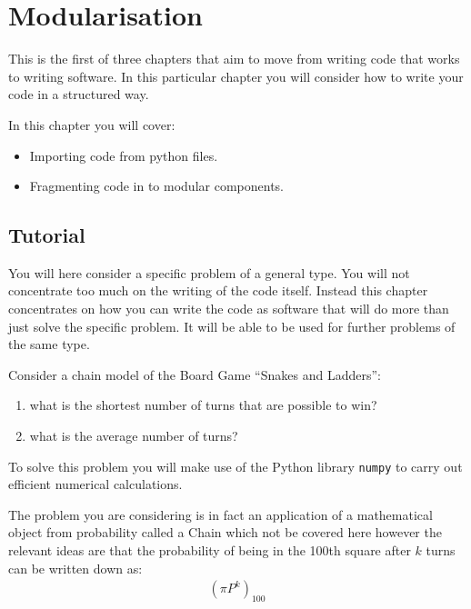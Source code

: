 \chapter{Modularisation}
\label{chp:modularisation}

This is the first of three chapters that aim to move from writing code
that works to writing software. In this particular chapter you will consider how
to write your code in a structured way.

In this chapter you will cover:
\begin{itemize}
    \item Importing code from python files.
    \item Fragmenting code in to modular components.
\end{itemize}


\section{Tutorial}
\label{sec:modularisation_tutorial}

You will here consider a specific problem of a general type. You will not
concentrate too much on the writing of the code itself. Instead this chapter
concentrates
on how you can write the code as software that will do more than just solve the
specific problem. It will be able to be used for further problems of the same
type.

Consider a  chain model of the Board Game ``Snakes and Ladders'':
\begin{enumerate}

\item 

what is the shortest number of turns that are possible to win?

\item 

what is the average number of turns?

\end{enumerate}



To solve this problem you will make use of the Python library \texttt{numpy}
to carry out efficient
numerical calculations.


The problem you are considering is in fact an application of a mathematical
object from probability called a  Chain which not be covered here 
however the relevant ideas are that the probability of being in the
100th square after \(k\) turns can be written down as:
\begin{equation*}
\begin{split}
    (\pi P ^ k)_{100}
\end{split}
\end{equation*}

